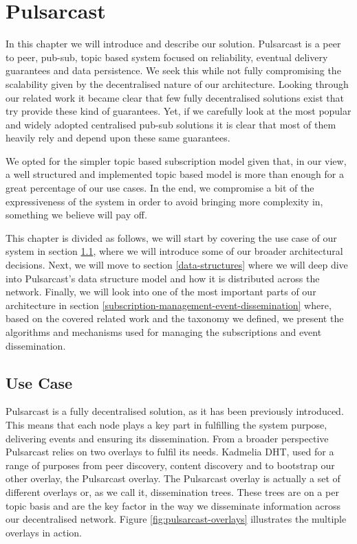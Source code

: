 
\chapter{Pulsarcast}
\label{chapter:pulsarcast}

In this chapter we will introduce and describe our solution. Pulsarcast is a
peer to peer, pub-sub, topic based system focused on reliability, eventual
delivery guarantees and data persistence. We seek this while not fully
compromising the scalability given by the decentralised nature of our
architecture. Looking through our related work it became clear that few fully
decentralised solutions exist that try provide these kind of guarantees. Yet,
if we carefully look at the most popular and widely adopted centralised pub-sub
solutions it is clear that most of them heavily rely and depend upon these same
guarantees. 

We opted for the simpler topic based subscription model given that, in our
view, a well structured and implemented topic based model is more than enough
for a great percentage of our use cases. In the end, we compromise a bit of the
expressiveness of the system in order to avoid bringing more complexity in,
something we believe will pay off.

This chapter is divided as follows, we will start by covering the use case of
our system in section \ref{use-case}, where we will introduce some of our
broader architectural decisions. Next, we will move to section
\ref{data-structures} where we will deep dive into Pulsarcast's data structure
model and how it is distributed across the network. Finally, we will look into
one of the most important parts of our architecture in section
\ref{subscription-management-event-dissemination} where, based on the covered
related work and the taxonomy we defined, we present the algorithms and
mechanisms used for managing the subscriptions and event dissemination.

\section{Use Case}\label{use-case}

Pulsarcast is a fully decentralised solution, as it has been previously
introduced. This means that each node plays a key part in fulfilling the system
purpose, delivering events and ensuring its dissemination. From a broader
perspective Pulsarcast relies on two overlays to fulfil its needs. Kadmelia
DHT, used for a range of purposes from peer discovery, content discovery and to
bootstrap our other overlay, the Pulsarcast overlay. The Pulsarcast overlay is
actually a set of different overlays or, as we call it, dissemination trees.
These trees are on a per topic basis and are the key factor in the way we
disseminate information across our decentralised network. Figure \ref{fig:pulsarcast-overlays} illustrates the multiple overlays in action.

